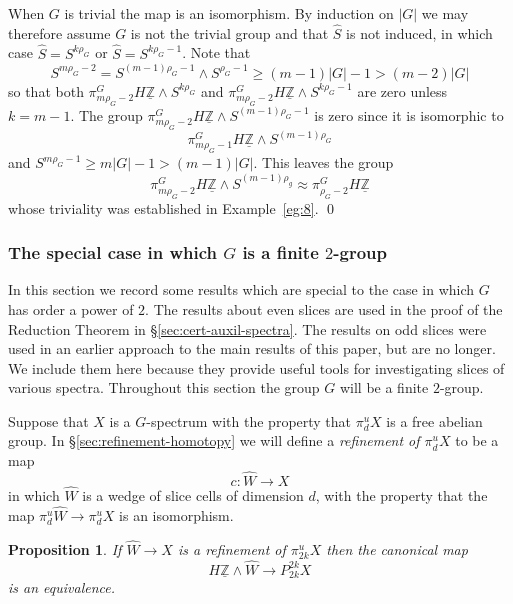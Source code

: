 \documentclass{amsart}
\newtheorem{prop}[equation]{Proposition}
\theoremstyle{definition}
\theoremstyle{remark}
\newenvironment{pf}{\bigskip{\em Proof:\/}}{\qed\medskip}
\newcommand{\Z}{{\mathbb Z}}
\newcommand{\slc}[2]{P_{#1}^{#1}#2}
\newcommand{\piu}{\pi^{u}}
\newcommand{\Zm}{\underline{\Z}}
\newcommand{\slicecell}{\widehat{S}}
\newcommand{\refine}{\widehat{W}}
\begin{document}
\begin{pf}
When $G$ is trivial the map is an isomorphism.  By induction on $|G|$
we may therefore assume $G$ is not the trivial group and that
$\slicecell$ is not induced, in which case $\slicecell=S^{k\rho_{G}}$
or $\slicecell= S^{k\rho_{G}-1}$.  Note that
\[
S^{m\rho_{G}-2} = S^{(m-1)\rho_{G}-1}\wedge S^{\rho_{G}-1}\ge (m-1)|G|-1 > (m-2)|G|
\]
so that both $\pi^{G}_{m\rho_{G}-2}H\Zm\wedge S^{k\rho_{G}}$ and
$\pi^{G}_{m\rho_{G}-2}H\Zm\wedge S^{k\rho_{G}-1}$ are zero unless $k=m-1$.
The group $\pi^{G}_{m\rho_{G}-2}H\Zm \wedge S^{(m-1)\rho_{G}-1}$ is
zero since it is isomorphic to
\[
\pi^{G}_{m\rho_{G}-1}H\Zm\wedge S^{(m-1)\rho_{G}}
\]
and $S^{m\rho_{G}-1}\ge m|G|-1 > (m-1)|G|$.   This leaves the group
\[
\pi^{G}_{m\rho_{G}-2}H\Zm\wedge S^{(m-1)\rho_{g}} \approx
\pi^{G}_{\rho_{G}-2}H\Zm
\]
whose triviality was established in Example~\ref{eg:8}.
\end{pf}





\subsubsection{The special case in which $G$ is a finite $2$-group}
\label{sec:special-case-g=ztn}

In this section we record some results which are special to the case
in which $G$ has order a power of $2$.  The results about even slices
are used in the proof of the Reduction Theorem in
\S\ref{sec:cert-auxil-spectra}.  The results on odd slices were used
in an earlier approach to the main results of this paper, but are no
longer.  We include them here because they provide useful tools for
investigating slices of various spectra.  Throughout this section the
group $G$ will be a finite $2$-group.

Suppose that $X$ is a $G$-spectrum with the property that $\piu_{d}X$ is a
free abelian group.   In \S\ref{sec:refinement-homotopy} we will define 
a {\em refinement of $\piu_{d}X$} to be a map
\[
c:\refine\to X
\]
in which $\refine$ is a wedge of slice cells of dimension $d$, with
the property that the map $\piu_{d}\refine\to\piu_{d}X$ is an
isomorphism.

\begin{prop}
\label{thm:81} 
If $\refine\to X$ is a refinement of $\piu_{2k}X$ then
the canonical map
\[
H\Zm\wedge \refine\to \slc{2k}{X}
\]
is an equivalence.
\end{prop}
\end{document}
